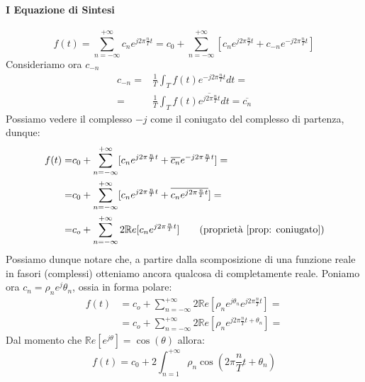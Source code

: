 \paragraph{I Equazione di Sintesi}\begin{equation*}
    f(t) = \sum_{n = -\infty}^{+\infty} c_n e^{j2\pi \frac{n}{T} t} = c_0 + \sum_{n = -\infty}^{+\infty}[ c_n e^{j2\pi \frac{n}{T} t} + c_{-n} e^{-j2\pi \frac{n}{T} t}] \tag{separo i $c_n$}
\end{equation*}
Consideriamo ora $c_{-n}$
\begin{align*}
    c_{-n} =& \frac{1}{T} \int_{T} f(t)e^{-j2\pi \frac{n}{T}t} dt = \\
    =& \frac{1}{T} \int_{T} f(t)\overline{e^{j2\pi \frac{n}{T}t}} dt = \overline{c_n}
\end{align*}
Possiamo vedere il complesso $-j$ come il coniugato del complesso di partenza, dunque:
\begin{align*}
    f(t) =& c_0 + \sum_{n = -\infty}^{+\infty}[ c_n e^{j2\pi \frac{n}{T} t} + \overline{c_{n}} e^{-j2\pi \frac{n}{T}t }] =\\
         =& c_0 + \sum_{n = -\infty}^{+\infty}[ c_n e^{j2\pi \frac{n}{T} t} + \overline{c_{n} e^{j2\pi \frac{n}{T}t} }] = \\
         =& c_o + \sum_{n = -\infty}^{+\infty} 2\mathbb{R}e [c_n e^{j2\pi \frac{n}{T}t}] \tag{proprietà \ref{prop: coniugato}}
\end{align*}
Possiamo dunque notare che, a partire dalla scomposizione di una funzione reale in fasori (complessi) otteniamo ancora qualcosa di completamente reale.
Poniamo ora $c_n = \rho_n e^j \theta_n$, ossia in forma polare:
\begin{align*}
    f(t) &= c_o + \sum_{n = -\infty}^{+\infty} 2\mathbb{R}e [\rho_n e^{j \theta_n} e^{j2\pi \frac{n}{T}t}] =\\
         &= c_o + \sum_{n = -\infty}^{+\infty} 2\mathbb{R}e [\rho_n e^{j2\pi \frac{n}{T}t +\theta_n }] =
\end{align*}
Dal momento che $\mathbb{R}e[e^{j\theta}] = \cos(\theta)$ allora:
\begin{equation}
    f(t) = c_0 + 2 \int_{n = 1}^{+\infty} \rho_n \cos\left(2\pi \frac{n}{T}t +\theta_n\right)
\end{equation}

